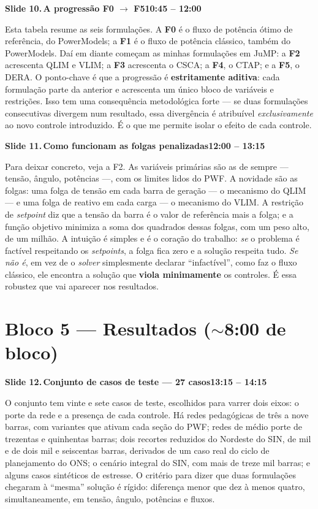\documentclass[11pt,a4paper]{article}
\newcommand{\slide}[3]{%
  \bigskip
  \noindent\colorbox{chipbg}{\parbox{\dimexpr\linewidth-2\fboxsep\relax}{%
    \textbf{\textcolor{ufcblue}{#1}}\,\textbf{#2}\hfill\textbf{\textcolor{ufcblue}{#3}}}}\par
  \nopagebreak\medskip
}
\begin{document}
\slide{Slide 10.}{A progressão F0 $\to$ F5}{10:45 -- 12:00}
Esta tabela resume as seis formulações. A \textbf{F0} é o fluxo de potência ótimo de referência, do PowerModels; a \textbf{F1} é o fluxo de potência clássico, também do PowerModels. Daí em diante começam as minhas formulações em JuMP: a \textbf{F2} acrescenta QLIM e VLIM; a \textbf{F3} acrescenta o CSCA; a \textbf{F4}, o CTAP; e a \textbf{F5}, o DERA. O ponto-chave é que a progressão é \textbf{estritamente aditiva}: cada formulação parte da anterior e acrescenta um único bloco de variáveis e restrições. Isso tem uma consequência metodológica forte --- se duas formulações consecutivas divergem num resultado, essa divergência é atribuível \emph{exclusivamente} ao novo controle introduzido. É o que me permite isolar o efeito de cada controle.

\slide{Slide 11.}{Como funcionam as folgas penalizadas}{12:00 -- 13:15}
Para deixar concreto, veja a F2. As variáveis primárias são as de sempre --- tensão, ângulo, potências ---, com os limites lidos do PWF. A novidade são as folgas: uma folga de tensão em cada barra de geração --- o mecanismo do QLIM --- e uma folga de reativo em cada carga --- o mecanismo do VLIM. A restrição de \textit{setpoint} diz que a tensão da barra é o valor de referência mais a folga; e a função objetivo minimiza a soma dos quadrados dessas folgas, com um peso alto, de um milhão. A intuição é simples e é o coração do trabalho: \emph{se} o problema é factível respeitando os \textit{setpoints}, a folga fica zero e a solução respeita tudo. \emph{Se não é}, em vez de o \textit{solver} simplesmente declarar ``infactível'', como faz o fluxo clássico, ele encontra a solução que \textbf{viola minimamente} os controles. É essa robustez que vai aparecer nos resultados.

\section*{\textcolor{ufcblue}{Bloco 5 --- Resultados ($\sim$8:00 de bloco)}}

\slide{Slide 12.}{Conjunto de casos de teste --- 27 casos}{13:15 -- 14:15}
O conjunto tem vinte e sete casos de teste, escolhidos para varrer dois eixos: o porte da rede e a presença de cada controle. Há redes pedagógicas de três a nove barras, com variantes que ativam cada seção do PWF; redes de médio porte de trezentas e quinhentas barras; dois recortes reduzidos do Nordeste do SIN, de mil e de dois mil e seiscentas barras, derivados de um caso real do ciclo de planejamento do ONS; o cenário integral do SIN, com mais de treze mil barras; e alguns casos sintéticos de estresse. O critério para dizer que duas formulações chegaram à ``mesma'' solução é rígido: diferença menor que dez à menos quatro, simultaneamente, em tensão, ângulo, potências e fluxos.
\end{document}
